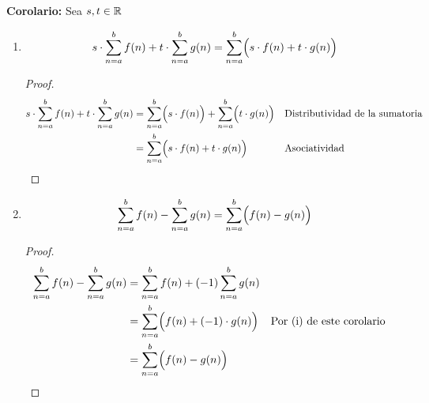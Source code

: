\begin{enumerate}[label=\alph*)]
    \textbf{Corolario:} Sea $s,t\in \mathbb{R}$ \begin{enumerate}[label=\roman*)]  
      \item \[s\cdot \sum_{n=a}^{b} f(n) + t\cdot \sum_{n=a}^{b} g(n) = \sum_{n=a}^{b} \Bigl(s\cdot f(n) + t\cdot g(n)\Bigr)\]
      \begin{proof}
        \begin{align*}
          s\cdot \sum_{n=a}^{b} f(n) + t\cdot \sum_{n=a}^{b} g(n) &= \sum_{n=a}^{b} \Bigl(s\cdot f(n)\Bigr) + \sum_{n=a}^{b} \Bigl(t\cdot g(n)\Bigr) && \text{Distributividad de la sumatoria}\\
          &= \sum_{n=a}^{b} \Bigl(s\cdot f(n) + t\cdot g(n)\Bigr) && \text{Asociatividad} \qedhere
        \end{align*}
      \end{proof}
      \item \[\sum_{n=a}^{b} f(n) - \sum_{n=a}^{b} g(n) = \sum_{n=a}^{b} \Bigl(f(n) - g(n)\Bigr)\]
      \begin{proof}
        \begin{align*}
          \sum_{n=a}^{b} f(n) - \sum_{n=a}^{b} g(n) &= \sum_{n=a}^{b} f(n) + (-1)\sum_{n=a}^{b} g(n)\\
          &= \sum_{n=a}^{b} \Bigl(f(n) + (-1)\cdot g(n)\Bigr) && \text{Por (i) de este corolario}\\
          &= \sum_{n=a}^{b} \Bigl(f(n) - g(n)\Bigr)
        \end{align*}
      \end{proof}
    \end{enumerate}

  
      
      

\end{enumerate}
